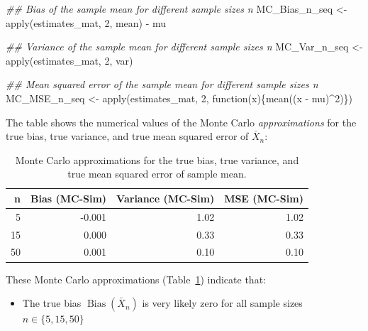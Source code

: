 \documentclass[
  letterpaper,
  DIV=11,
  numbers=noendperiod]{scrreprt}
\newenvironment{Shaded}{\begin{snugshade}}{\end{snugshade}}
\newcommand{\ControlFlowTok}[1]{\textcolor[rgb]{0.00,0.23,0.31}{#1}}
\newcommand{\DecValTok}[1]{\textcolor[rgb]{0.68,0.00,0.00}{#1}}
\newcommand{\DocumentationTok}[1]{\textcolor[rgb]{0.37,0.37,0.37}{\textit{#1}}}
\newcommand{\FunctionTok}[1]{\textcolor[rgb]{0.28,0.35,0.67}{#1}}
\newcommand{\NormalTok}[1]{\textcolor[rgb]{0.00,0.23,0.31}{#1}}
\newcommand{\OtherTok}[1]{\textcolor[rgb]{0.00,0.23,0.31}{#1}}
\newcommand{\SpecialCharTok}[1]{\textcolor[rgb]{0.37,0.37,0.37}{#1}}
\providecommand{\tightlist}{%
  \setlength{\itemsep}{0pt}\setlength{\parskip}{0pt}}\usepackage{longtable,booktabs,array}
\theoremstyle{definition}
\theoremstyle{plain}
\theoremstyle{plain}
\theoremstyle{remark}
\begin{document}
\begin{Shaded}
\begin{Highlighting}[]
\DocumentationTok{\#\# Bias of the sample mean for different sample sizes n}
\NormalTok{MC\_Bias\_n\_seq }\OtherTok{\textless{}{-}} \FunctionTok{apply}\NormalTok{(estimates\_mat, }\DecValTok{2}\NormalTok{, mean) }\SpecialCharTok{{-}}\NormalTok{ mu}

\DocumentationTok{\#\# Variance of the sample mean for different sample sizes n}
\NormalTok{MC\_Var\_n\_seq  }\OtherTok{\textless{}{-}} \FunctionTok{apply}\NormalTok{(estimates\_mat, }\DecValTok{2}\NormalTok{, var)}

\DocumentationTok{\#\# Mean squared error of the sample mean for different sample sizes n}
\NormalTok{MC\_MSE\_n\_seq  }\OtherTok{\textless{}{-}} \FunctionTok{apply}\NormalTok{(estimates\_mat, }\DecValTok{2}\NormalTok{, }\ControlFlowTok{function}\NormalTok{(x)\{}\FunctionTok{mean}\NormalTok{((x }\SpecialCharTok{{-}}\NormalTok{ mu)}\SpecialCharTok{\^{}}\DecValTok{2}\NormalTok{)\})}
\end{Highlighting}
\end{Shaded}

The table shows the numerical values of the Monte Carlo
\emph{approximations} for the true bias, true variance, and true mean
squared error of \(\bar{X}_n\):

\hypertarget{tbl-mcbvmse}{}
\begin{table}
\caption{\label{tbl-mcbvmse}Monte Carlo approximations for the true bias, true variance, and true
mean squared error of sample mean. }\tabularnewline

\centering
\begin{tabular}[t]{r|r|r|r}
\hline
n & Bias (MC-Sim)  & Variance (MC-Sim) & MSE (MC-Sim) \\
\hline
5 & -0.001 & 1.02 & 1.02\\
\hline
15 & 0.000 & 0.33 & 0.33\\
\hline
50 & 0.001 & 0.10 & 0.10\\
\hline
\end{tabular}
\end{table}

These Monte Carlo approximations (Table~\ref{tbl-mcbvmse}) indicate
that:

\begin{itemize}
\tightlist
\item
  The true bias \(\operatorname{Bias}(\bar{X}_n)\) is very likely zero
  for all sample sizes \(n\in\{5,15,50\}\)
\end{itemize}
\end{document}
